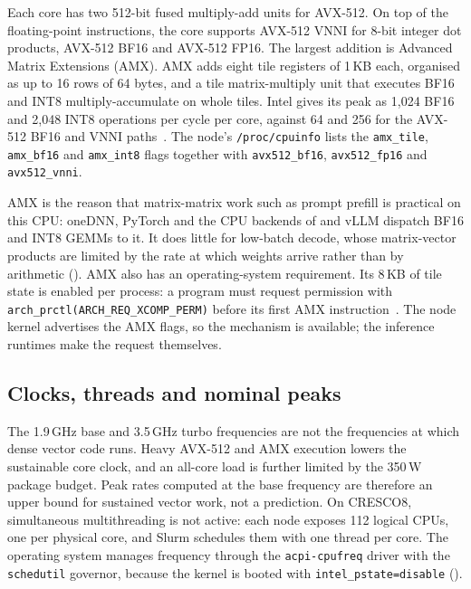 Each core has two 512-bit fused multiply-add units for AVX-512.  On top
of the floating-point instructions, the core supports AVX-512 VNNI for
8-bit integer dot products, AVX-512 BF16 and AVX-512 FP16.  The largest
addition is Advanced Matrix Extensions (AMX).  AMX adds eight tile
registers of 1\,KB each, organised as up to 16 rows of 64 bytes, and a tile
matrix-multiply unit that executes BF16 and INT8 multiply-accumulate on
whole tiles.  Intel gives its peak as 1{,}024 BF16 and 2{,}048 INT8
operations per cycle per core, against 64 and 256 for the AVX-512 BF16 and
VNNI paths~\cite{intelarchday2021}.  The node's \texttt{/proc/cpuinfo}
lists the \texttt{amx\_tile}, \texttt{amx\_bf16} and \texttt{amx\_int8}
flags together with \texttt{avx512\_bf16}, \texttt{avx512\_fp16} and
\texttt{avx512\_vnni}.

AMX is the reason that matrix-matrix work such as prompt prefill is
practical on this CPU: oneDNN, PyTorch and the CPU backends of
\lcpp{} and vLLM dispatch BF16 and INT8 GEMMs to it.  It does little for
low-batch decode, whose matrix-vector products are limited by the rate at
which weights arrive rather than by arithmetic ().
AMX also has an operating-system requirement.  Its 8\,KB of tile state is
enabled per process: a program must request permission with
\texttt{arch\_prctl(ARCH\_REQ\_XCOMP\_PERM)} before its first AMX
instruction~\cite{linuxxstate}.  The node kernel advertises the AMX
flags, so the mechanism is available; the inference runtimes make the
request themselves.

\subsection{Clocks, threads and nominal peaks}
\label{sec:xeon-max-peaks}

The 1.9\,GHz base and 3.5\,GHz turbo frequencies are not the frequencies
at which dense vector code runs.  Heavy AVX-512 and AMX execution lowers
the sustainable core clock, and an all-core load is further limited by
the 350\,W package budget.  Peak rates computed at the base frequency are
therefore an upper bound for sustained vector work, not a prediction.
On CRESCO8, simultaneous multithreading is not active: each node exposes
112 logical CPUs, one per physical core, and Slurm schedules them with one
thread per core.  The operating system manages frequency through the
\texttt{acpi-cpufreq} driver with the \texttt{schedutil} governor,
because the kernel is booted with \texttt{intel\_pstate=disable}
().

